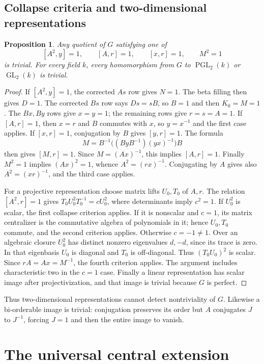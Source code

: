\documentclass[11pt]{amsart}
\newtheorem{proposition}[theorem]{Proposition}
\theoremstyle{definition}
\theoremstyle{remark}
\begin{document}
\subsection{Collapse criteria and two-dimensional representations}
\begin{proposition}\label{prop:collapse}
Any quotient of $G$ satisfying one of
\[
 [A^2,y]=1,\qquad[A,r]=1,\qquad[x,r]=1,\qquad M^2=1
\]
is trivial. For every field $k$, every homomorphism from $G$ to
$\operatorname{PGL}_2(k)$ or $\operatorname{GL}_2(k)$ is trivial.
\end{proposition}
\begin{proof}
If $[A^2,y]=1$, the corrected $As$ row gives $N=1$.
The beta filling then gives $D=1$. The corrected $Bs$ row says
$Ds=sB$, so $B=1$ and then $K_0=M=1$. The $Bx,By$ rows give
$x=y=1$; the remaining rows give $r=s=A=1$.
If $[A,r]=1$, then $x=r$ and $B$ commutes with $x$, so
$y=x^{-1}$ and the first case applies.
If $[x,r]=1$, conjugation by $B$ gives $[y,r]=1$. The formula
\[
 M=B^{-1}\bigl((ByB^{-1})(yx)^{-1}\bigr)B
\]
then gives $[M,r]=1$. Since $M=(Ax)^{-1}$, this implies $[A,r]=1$.
Finally $M^2=1$ implies $(Ax)^2=1$, whence
$A^2=(rx)^{-1}$. Conjugating by $A$ gives also $A^2=(xr)^{-1}$,
and the third case applies.

For a projective representation choose matrix lifts $U_0,T_0$ of
$A,r$. The relation $[A^2,r]=1$ gives
$T_0U_0^2T_0^{-1}=cU_0^2$, where determinants imply $c^2=1$.
If $U_0^2$ is scalar, the first collapse criterion applies. If it is
nonscalar and $c=1$, its matrix centralizer is the commutative algebra
of polynomials in it; hence $U_0,T_0$ commute, and the second criterion
applies. Otherwise $c=-1\ne1$. Over an algebraic closure $U_0^2$
has distinct nonzero eigenvalues $d,-d$, since its trace is zero.
In that eigenbasis $U_0$ is diagonal and $T_0$ is off-diagonal.
Thus $(T_0U_0)^2$ is scalar. Since $rA=Ax=M^{-1}$, the fourth
criterion applies. The argument includes characteristic two in the
$c=1$ case. Finally a linear representation has scalar image after
projectivization, and that image is trivial because $G$ is perfect.
\end{proof}

Thus two-dimensional representations cannot detect nontriviality of
$G$. Likewise a
bi-orderable image is trivial: conjugation preserves its order but
$A$ conjugates $J$ to $J^{-1}$, forcing $J=1$ and then the entire
image to vanish.

\section{The universal central extension}\label{sec:central}
\end{document}
